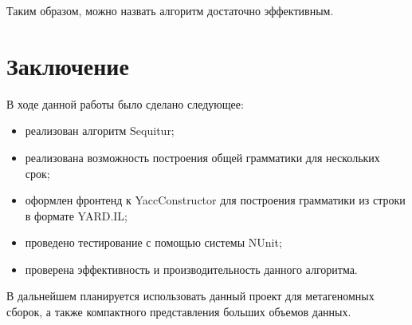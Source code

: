 \documentclass[14pt]{matmex-diploma}
\begin{document}
    Таким образом, можно назвать алгоритм достаточно эффективным.



\section{Заключение}
    В ходе данной работы было сделано следующее:
    \begin{itemize}
        \item реализован алгоритм Sequitur;
        \item реализована возможность построения общей грамматики для нескольких срок; 
        \item оформлен фронтенд к YaccConstructor для построения грамматики из строки в формате YARD.IL;
        \item проведено тестирование с помощью системы NUnit;
        \item проверена эффективность и производительность данного алгоритма.
    \end{itemize}

    В дальнейшем планируется использовать данный проект для метагеномных сборок, а также компактного представления больших объемов данных.

\setmonofont[Mapping=tex-text]{CMU Typewriter Text}


\end{document}
